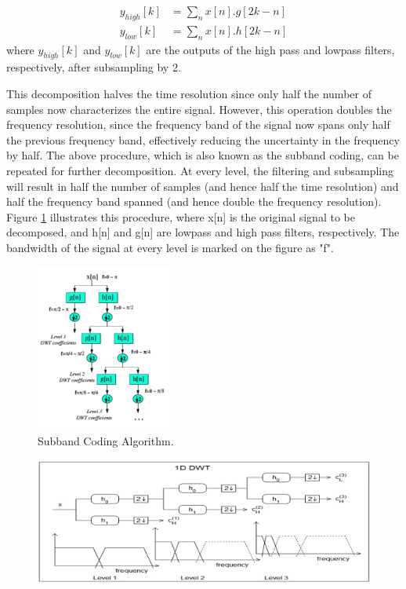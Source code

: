 \documentclass[12pt, a4paper, twoside]{report}
\begin{document}
\begin{align}
y_{high}[k] &= \sum_{n} x[n].g[2k-n] \\ 
y_{low}[k] &= \sum_{n} x[n].h[2k-n]
\end{align}
where $y_{high}[k]$ and $y_{low}[k]$ are the outputs of the high pass and lowpass filters, respectively, after subsampling by 2. 
\par
This decomposition halves the time resolution since only half the number of samples now characterizes the entire signal. However, this operation doubles the frequency resolution, since the frequency band of the signal now spans only half the previous frequency band, effectively reducing the uncertainty in the frequency by half. The above procedure, which is also known as the subband coding, can be repeated for further decomposition. At every level, the filtering and subsampling will result in half the number of samples (and hence half the time resolution) and half the frequency band spanned (and hence double the frequency resolution). Figure \ref{fig:subband-algorithm} illustrates this procedure, where x[n] is the original signal to be decomposed, and h[n] and g[n] are lowpass and high pass filters, respectively. The bandwidth of the signal at every level is marked on the figure as "f".

\begin{figure}[!h]
	\centering
	\includegraphics[width=0.4\textwidth]
	{images/chapter3/subband-algorithm}
	\caption{Subband Coding Algorithm.}
	\label{fig:subband-algorithm}
\end{figure}

\begin{figure}[!h]
	\centering
	\includegraphics[width=.8\textwidth]
	{images/chapter3/subband-algorithm-2}
	\caption{}
	\label{fig:subband-algorithm-2}
\end{figure}
\end{document}

